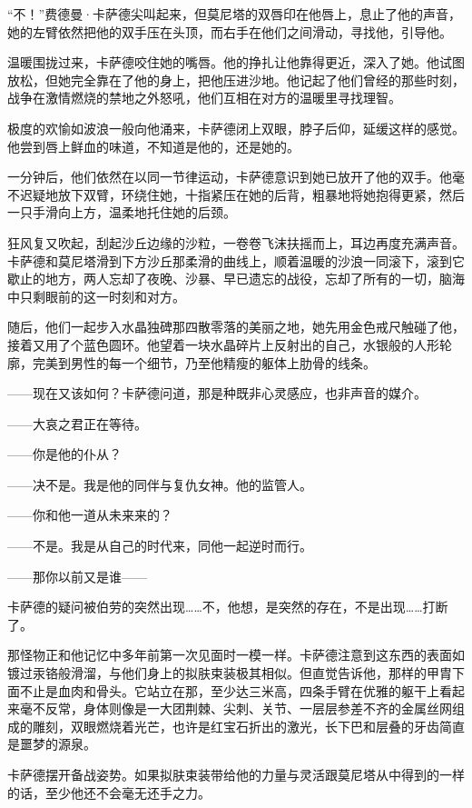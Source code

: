 \documentclass[AutoFakeBold=true]{book}
\begin{document}
``不！''费德曼·卡萨德尖叫起来，但莫尼塔的双唇印在他唇上，息止了他的声音，她的左臂依然把他的双手压在头顶，而右手在他们之间滑动，寻找他，引导他。

温暖围拢过来，卡萨德咬住她的嘴唇。他的挣扎让他靠得更近，深入了她。他试图放松，但她完全靠在了他的身上，把他压进沙地。他记起了他们曾经的那些时刻，战争在激情燃烧的禁地之外怒吼，他们互相在对方的温暖里寻找理智。

极度的欢愉如波浪一般向他涌来，卡萨德闭上双眼，脖子后仰，延缓这样的感觉。他尝到唇上鲜血的味道，不知道是他的，还是她的。

一分钟后，他们依然在以同一节律运动，卡萨德意识到她已放开了他的双手。他毫不迟疑地放下双臂，环绕住她，十指紧压在她的后背，粗暴地将她抱得更紧，然后一只手滑向上方，温柔地托住她的后颈。

狂风复又吹起，刮起沙丘边缘的沙粒，一卷卷飞沫扶摇而上，耳边再度充满声音。卡萨德和莫尼塔滑到下方沙丘那柔滑的曲线上，顺着温暖的沙浪一同滚下，滚到它歇止的地方，两人忘却了夜晚、沙暴、早已遗忘的战役，忘却了所有的一切，脑海中只剩眼前的这一时刻和对方。

\vspace*{1em}

随后，他们一起步入水晶独碑那四散零落的美丽之地，她先用金色戒尺触碰了他，接着又用了个蓝色圆环。他望着一块水晶碎片上反射出的自己，水银般的人形轮廓，完美到男性的每一个细节，乃至他精瘦的躯体上肋骨的线条。

{\kaishu ——现在又该如何？}卡萨德问道，那是种既非心灵感应，也非声音的媒介。

{\kaishu ——大哀之君正在等待。}

{\kaishu ——你是他的仆从？}

{\kaishu ——决不是。我是他的同伴与复仇女神。他的监管人。}

{\kaishu ——你和他一道从未来来的？}

{\kaishu ——不是。我是从自己的时代来，同他一起逆时而行。}

{\kaishu ——那你以前又是谁——}

卡萨德的疑问被伯劳的突然出现……不，他想，是{\kaishu 突然的}存在，不是{\kaishu 出现}……打断了。

那怪物正和他记忆中多年前第一次见面时一模一样。卡萨德注意到这东西的表面如镀过汞铬般滑溜，与他们身上的拟肤束装极其相似。但直觉告诉他，那样的甲胄下面不止是血肉和骨头。它站立在那，至少达三米高，四条手臂在优雅的躯干上看起来毫不反常，身体则像是一大团荆棘、尖刺、关节、一层层参差不齐的金属丝网组成的雕刻，双眼燃烧着光芒，也许是红宝石折出的激光，长下巴和层叠的牙齿简直是噩梦的源泉。

卡萨德摆开备战姿势。如果拟肤束装带给他的力量与灵活跟莫尼塔从中得到的一样的话，至少他还不会毫无还手之力。
\end{document}
